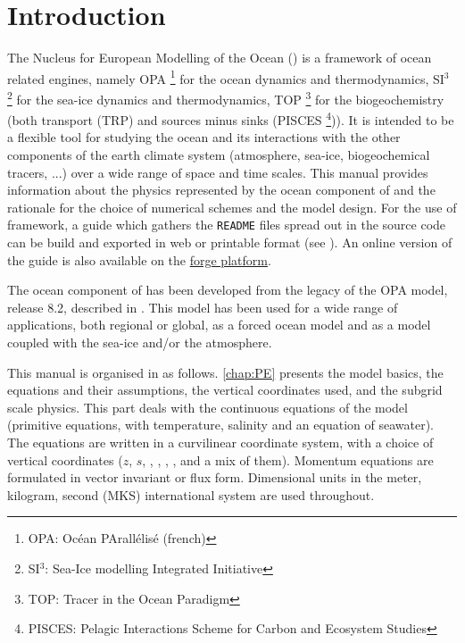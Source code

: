 \documentclass[../main/NEMO_manual]{subfiles}
\begin{document}

\chapter{Introduction}

The Nucleus for European Modelling of the Ocean (\NEMO) is a framework of ocean related engines,
namely OPA \footnote{OPA: Oc\'{e}an PArall\'{e}lis\'{e} (french)} for the ocean dynamics and thermodynamics,
SI$^3$ \footnote{SI$^3$: Sea-Ice modelling Integrated Initiative} for the sea-ice dynamics and thermodynamics,
TOP \footnote{TOP: Tracer in the Ocean Paradigm} for the biogeochemistry 
(both transport (TRP) and sources minus sinks 
(PISCES \footnote{PISCES: Pelagic Interactions Scheme for Carbon and Ecosystem Studies})).
It is intended to be a flexible tool for studying the ocean and its interactions with the other components of
the earth climate system (atmosphere, sea-ice, biogeochemical tracers, ...) over
a wide range of space and time scales.
This manual provides information about the physics represented by the ocean component of \NEMO and
the rationale for the choice of numerical schemes and the model design.
For the use of framework, 
a guide which gathers the \texttt{README} files spread out in the source code can be build and 
exported in web or printable format (see ).
An online version of the guide is also available on the 
\href{http://forge.ipsl.jussieu.fr/nemo}{\NEMO forge platform}.

The ocean component of \NEMO has been developed from the legacy of the OPA model, release 8.2, 
described in \citet{Madec1998}.
This model has been used for a wide range of applications, both regional or global, as a forced ocean model and 
as a model coupled with the sea-ice and/or the atmosphere.

This manual is organised in as follows.
\autoref{chap:PE} presents the model basics, \ie the equations and their assumptions,
the vertical coordinates used, and the subgrid scale physics.
This part deals with the continuous equations of the model
(primitive equations, with temperature, salinity and an equation of seawater).
The equations are written in a curvilinear coordinate system, with a choice of vertical coordinates
($z$, $s$, \zstar, \sstar, \ztilde, \stilde, and a mix of them).
Momentum equations are formulated in vector invariant or flux form.
Dimensional units in the meter, kilogram, second (MKS) international system are used throughout.
\end{document}
